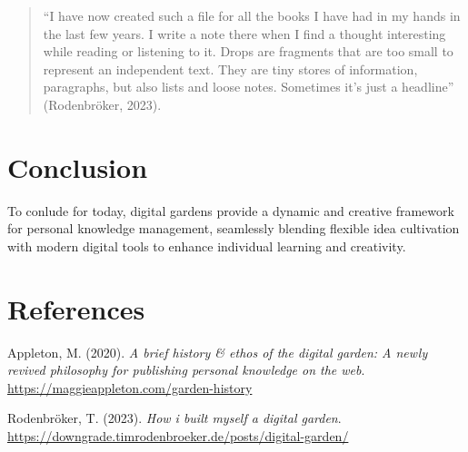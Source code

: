 \documentclass[
]{agujournal2019}
\newlength{\cslhangindent}
\newenvironment{CSLReferences}[2] %
 {\begin{list}{}{%
  \setlength{\itemindent}{0pt}
  \setlength{\leftmargin}{0pt}
  \setlength{\parsep}{0pt}
  \ifodd #1
   \setlength{\leftmargin}{\cslhangindent}
   \setlength{\itemindent}{-1\cslhangindent}
  \fi
  \setlength{\itemsep}{#2\baselineskip}}}
 {\end{list}}
\begin{document}
\begin{quote}
``I have now created such a file for all the books I have had in my
hands in the last few years. I write a note there when I find a thought
interesting while reading or listening to it. Drops are fragments that
are too small to represent an independent text. They are tiny stores of
information, paragraphs, but also lists and loose notes. Sometimes it's
just a headline'' (Rodenbröker, 2023).
\end{quote}

\section{Conclusion}\label{conclusion}

To conlude for today, digital gardens provide a dynamic and creative
framework for personal knowledge management, seamlessly blending
flexible idea cultivation with modern digital tools to enhance
individual learning and creativity.

\section*{References}\label{references}

\label{refs}
\begin{CSLReferences}{1}{0}
\vspace{1em}

Appleton, M. (2020). \emph{A brief history \& ethos of the digital
garden: A newly revived philosophy for publishing personal knowledge on
the web}. \url{https://maggieappleton.com/garden-history}

Rodenbröker, T. (2023). \emph{How i built myself a digital garden}.
\url{https://downgrade.timrodenbroeker.de/posts/digital-garden/}

\end{CSLReferences}
\end{document}

